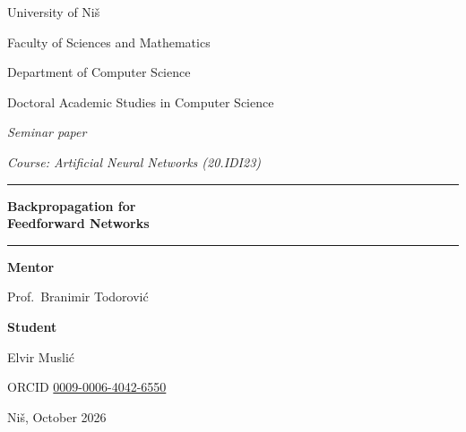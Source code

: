 \documentclass[11pt,a4paper]{amsart}
\numberwithin{equation}{section}
\theoremstyle{plain}
\theoremstyle{definition}
\theoremstyle{remark}
\begin{document}
\thispagestyle{empty}
\begin{center}
  {\large University of Niš\par}
  {\large Faculty of Sciences and Mathematics\par}
  \smallskip
  Department of Computer Science\par
  Doctoral Academic Studies in Computer Science\par

  \vspace{3em}
  {\itshape Seminar paper\par}
  {\itshape Course: Artificial Neural Networks (20.IDI23)\par}

  \vspace{3.5em}
  \rule{\linewidth}{0.4pt}\par
  \vspace{1em}
  {\LARGE\bfseries Backpropagation for\\[0.35em]
    Feedforward Networks\par}
  \vspace{1em}
  \rule{\linewidth}{0.4pt}\par
\end{center}

\vspace{3.5em}
\noindent
\begin{minipage}[t]{0.49\linewidth}
  \raggedright
  \textbf{Mentor}\par
  Prof.\ Branimir Todorović
\end{minipage}\hfill
\begin{minipage}[t]{0.49\linewidth}
  \raggedleft
  \textbf{Student}\par
  Elvir Muslić\,\par
  ORCID \href{https://orcid.org/0009-0006-4042-6550}{0009-0006-4042-6550}
\end{minipage}

\vfill
\begin{center}Niš, October 2026\end{center}
\newpage
\end{document}
